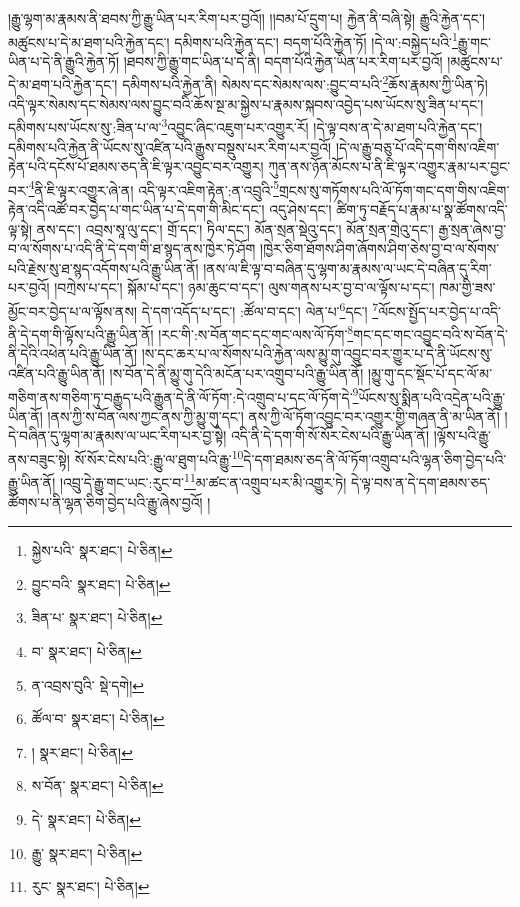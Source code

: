 །རྒྱུ་ལྷག་མ་རྣམས་ནི་ཐབས་ཀྱི་རྒྱུ་ཡིན་པར་རིག་པར་བྱའོ།། །།བམ་པོ་དྲུག་པ། རྐྱེན་ནི་བཞི་སྟེ། རྒྱུའི་རྐྱེན་དང་། མཚུངས་པ་དེ་མ་ཐག་པའི་རྐྱེན་དང་། དམིགས་པའི་རྐྱེན་དང་། བདག་པོའི་རྐྱེན་ཏོ། །དེ་ལ་:བསྐྱེད་པའི་\footnote{སྐྱེས་པའི་  སྣར་ཐང་།  པེ་ཅིན། }རྒྱུ་གང་ཡིན་པ་དེ་ནི་རྒྱུའི་རྐྱེན་ཏོ། །ཐབས་ཀྱི་རྒྱུ་གང་ཡིན་པ་དེ་ནི། བདག་པོའི་རྐྱེན་ཡིན་པར་རིག་པར་བྱའོ། །མཚུངས་པ་དེ་མ་ཐག་པའི་རྐྱེན་དང་། དམིགས་པའི་རྐྱེན་ནི། སེམས་དང་སེམས་ལས་:བྱུང་བ་པའི་\footnote{བྱུང་བའི་  སྣར་ཐང་།  པེ་ཅིན། }ཆོས་རྣམས་ཀྱི་ཡིན་ཏེ། འདི་ལྟར་སེམས་དང་སེམས་ལས་བྱུང་བའི་ཆོས་སྔ་མ་སྐྱེས་པ་རྣམས་སྐབས་འབྱེད་པས་ཡོངས་སུ་ཟིན་པ་དང་། དམིགས་པས་ཡོངས་སུ་:ཟིན་པ་ལ་\footnote{ཟིན་པ་  སྣར་ཐང་།  པེ་ཅིན། }འབྱུང་ཞིང་འཇུག་པར་འགྱུར་རོ། །དེ་ལྟ་བས་ན་དེ་མ་ཐག་པའི་རྐྱེན་དང་། དམིགས་པའི་རྐྱེན་ནི་ཡོངས་སུ་འཛིན་པའི་རྒྱུས་བསྡུས་པར་རིག་པར་བྱའོ། །དེ་ལ་རྒྱུ་བཅུ་པོ་འདི་དག་གིས་འཇིག་རྟེན་པའི་དངོས་པོ་ཐམས་ཅད་ནི་ཇི་ལྟར་འབྱུང་བར་འགྱུར། ཀུན་ནས་ཉོན་མོངས་པ་ནི་ཇི་ལྟར་འགྱུར་རྣམ་པར་བྱང་བར་\footnote{བ་  སྣར་ཐང་།  པེ་ཅིན། }ནི་ཇི་ལྟར་འགྱུར་ཞེ་ན། འདི་ལྟར་འཇིག་རྟེན་:ན་འབྲུའི་\footnote{ན་འབྲས་བུའི་  སྡེ་དགེ། }གྲངས་སུ་གཏོགས་པའི་ལོ་ཏོག་གང་དག་གིས་འཇིག་རྟེན་འདི་འཚོ་བར་བྱེད་པ་གང་ཡིན་པ་དེ་དག་གི་མིང་དང་། འདུ་ཤེས་དང་། ཚིག་ཏུ་བརྗོད་པ་རྣམ་པ་སྣ་ཚོགས་འདི་ལྟ་སྟེ། ནས་དང་། འབྲས་སཱ་ལུ་དང་། གྲོ་དང་། ཏིལ་དང་། མོན་སྲན་སྡེའུ་དང་། མོན་སྲན་གྲེའུ་དང་། རྒྱ་སྲན་ཞེས་བྱ་བ་ལ་སོགས་པ་འདི་ནི་དེ་དག་གི་ཐ་སྙད་ནས་ཁྱེར་ཏེ་ཤོག །ཁྱེར་ཅིག་ཐོགས་ཤིག་ཞོགས་ཤིག་ཅེས་བྱ་བ་ལ་སོགས་པའི་རྗེས་སུ་ཐ་སྙད་འདོགས་པའི་རྒྱུ་ཡིན་ནོ། །ནས་ལ་ཇི་ལྟ་བ་བཞིན་དུ་ལྷག་མ་རྣམས་ལ་ཡང་དེ་བཞིན་དུ་རིག་པར་བྱའོ། །བཀྲེས་པ་དང་། སྐོམ་པ་དང་། ཉམ་ཆུང་བ་དང་། ལུས་གནས་པར་བྱ་བ་ལ་ལྟོས་པ་དང་། ཁམ་གྱི་ཟས་མྱོང་བར་བྱེད་པ་ལ་ལྟོས་ནས། དེ་དག་འདོད་པ་དང་། :ཚོལ་བ་དང་། ལེན་པ་\footnote{ཚོལ་བ་  སྣར་ཐང་།  པེ་ཅིན། }དང་། \footnote{།    སྣར་ཐང་།  པེ་ཅིན། }ལོངས་སྤྱོད་པར་བྱེད་པ་འདི་ནི་དེ་དག་གི་ལྟོས་པའི་རྒྱུ་ཡིན་ནོ། །རང་གི་:ས་བོན་གང་དང་གང་ལས་ལོ་ཏོག་\footnote{ས་བོན་  སྣར་ཐང་།  པེ་ཅིན། }གང་དང་གང་འབྱུང་བའི་ས་བོན་དེ་ནི་དེའི་འཕེན་པའི་རྒྱུ་ཡིན་ནོ། །ས་དང་ཆར་པ་ལ་སོགས་པའི་རྐྱེན་ལས་མྱུ་གུ་འབྱུང་བར་གྱུར་པ་དེ་ནི་ཡོངས་སུ་འཛིན་པའི་རྒྱུ་ཡིན་ནོ། །ས་བོན་དེ་ནི་མྱུ་གུ་དེའི་མངོན་པར་འགྲུབ་པའི་རྒྱུ་ཡིན་ནོ། །མྱུ་གུ་དང་སྡོང་པོ་དང་ལོ་མ་གཅིག་ནས་གཅིག་ཏུ་བརྒྱུད་པའི་རྒྱུན་དེ་ནི་ལོ་ཏོག་:དེ་འགྲུབ་པ་དང་ལོ་ཏོག་དེ་\footnote{དེ་  སྣར་ཐང་།  པེ་ཅིན། }ཡོངས་སུ་སྨིན་པའི་འདྲེན་པའི་རྒྱུ་ཡིན་ནོ། །ནས་ཀྱི་ས་བོན་ལས་ཀྱང་ནས་ཀྱི་མྱུ་གུ་དང་། ནས་ཀྱི་ལོ་ཏོག་འབྱུང་བར་འགྱུར་གྱི་གཞན་ནི་མ་ཡིན་ནོ། །དེ་བཞིན་དུ་ལྷག་མ་རྣམས་ལ་ཡང་རིག་པར་བྱ་སྟེ། འདི་ནི་དེ་དག་གི་སོ་སོར་ངེས་པའི་རྒྱུ་ཡིན་ནོ། །ལྟོས་པའི་རྒྱུ་ནས་བཟུང་སྟེ། སོ་སོར་ངེས་པའི་:རྒྱུ་ལ་ཐུག་པའི་རྒྱུ་\footnote{རྒྱུ་  སྣར་ཐང་།  པེ་ཅིན། }དེ་དག་ཐམས་ཅད་ནི་ལོ་ཏོག་འགྲུབ་པའི་ལྷན་ཅིག་བྱེད་པའི་རྒྱུ་ཡིན་ནོ། །འབྲུ་དེ་རྒྱུ་གང་ཡང་:རུང་བ་\footnote{རུང་  སྣར་ཐང་།  པེ་ཅིན། }མ་ཚང་ན་འགྲུབ་པར་མི་འགྱུར་ཏེ། དེ་ལྟ་བས་ན་དེ་དག་ཐམས་ཅད་ཚོགས་པ་ནི་ལྷན་ཅིག་བྱེད་པའི་རྒྱུ་ཞེས་བྱའོ། །
